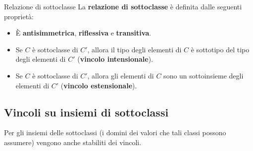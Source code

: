\documentclass[12pt]{report}
\begin{document}
	\begin{definizione}{Relazione di sottoclasse}{}
		La \textbf{relazione di sottoclasse }è definita dalle seguenti proprietà:
		\begin{itemize}
			\item È \textbf{antisimmetrica}, \textbf{riflessiva} e \textbf{transitiva}.
			\item Se $C$ è sottoclasse di $C'$, allora il tipo degli elementi di $C$ è sottotipo del tipo degli elementi di $C'$ (\textbf{vincolo intensionale}).
			\item Se $C$ è sottoclasse di $C'$, allora gli elementi di $C$ sono un sottoinsieme degli elementi di $C'$ (\textbf{vincolo estensionale}).
		\end{itemize}
	\end{definizione}
	
	\subsection{Vincoli su insiemi di sottoclassi}
	Per gli insiemi delle sottoclassi (i domini dei valori che tali classi possono assumere) vengono anche stabiliti dei vincoli.
	
\end{document}
